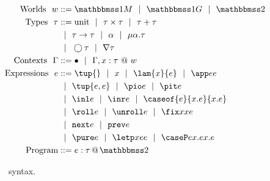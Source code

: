 
\begin{figure}
\begin{abstrsyn}
\[\begin{aligned}
\text{Worlds}\ \ 
\world &::= \bbonem \gbar \bbonep \gbar \bbtwo  \\
%
\text{Types}\ \ 
\type &::= \text{unit}%
 \gbar \type \times \type
 \gbar \type + \type \\
&\gbar \type \to \type
 \gbar \alpha \gbar \mu \alpha.\tau \\
&\gbar \fut \type 
 \gbar \curr \type \\
%
\text{Contexts}\ \ 
\context &::=\emptyC
 \gbar \context, x:\tau~@~w \\
%
\text{Expressions}\ \ 
\expr &::= \tup{}\gbar\var%
 \gbar \lam {\var}{\expr} 
 \gbar \app \expr \expr \\
&\gbar \tup{\expr, \expr} 
 \gbar \pio \expr 
 \gbar \pit \expr \\
&\gbar \inl \expr 
 \gbar \inr \expr
 \gbar \caseof {\expr}{\var.\expr}{\var.\expr}
\\ %
&\gbar \roll e
 \gbar \unroll e
 \gbar \fix \var \var \expr\\
&\gbar \next \expr 
 \gbar \prev \expr \\
&\gbar \pure \expr 
 \gbar \letp \var \expr \expr
 \gbar \caseP \expr {\var.\expr} {\var.\expr} \\
\text{Program} &::= \coltwo e \tau \\
\end{aligned}\]
\end{abstrsyn}
\caption{\lang~syntax.}
\label{fig:grammar}
\end{figure}
